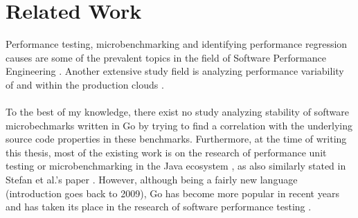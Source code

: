 \documentclass{seal_thesis}
\begin{document}
\section{Related Work}

Performance testing, microbenchmarking and identifying performance regression causes are some of the prevalent topics in the field of Software Performance Engineering \cite{laaber2019software, Laaber:2018:EOS:3196398.3196407, costa2019, chenshang, Nguyen:2014:ICS:2597073.2597092, Luo, Alcocer:2015:TDP:2816707.2816718, Stefan:2017:UTP:3030207.3030226, Horky:2015:UPU:2668930.2688051, Leitner:2017:ESS:3030207.3030213}. Another extensive study field is analyzing performance variability of and within the production clouds \cite{Iosup, Leitner:2016:PCS:2926746.2885497}.\\
\\
To the best of my knowledge, there exist no study analyzing stability of software microbechmarks written in Go by trying to find a correlation with the underlying source code properties in these benchmarks. Furthermore, at the time of writing this thesis, most of the existing work is on the research of performance unit testing or microbenchmarking in the Java ecosystem \cite{Stefan:2017:UTP:3030207.3030226, Horky:2015:UPU:2668930.2688051, Leitner:2017:ESS:3030207.3030213, costa2019}, as also similarly stated in Stefan et al.'s paper \cite{Stefan:2017:UTP:3030207.3030226}. However, although being a fairly new language (introduction goes back to 2009), Go has become more popular in recent years and has taken its place in the research of software performance testing \cite{laaber2019software, Laaber:2018:EOS:3196398.3196407}.\\
\\
\end{document}

